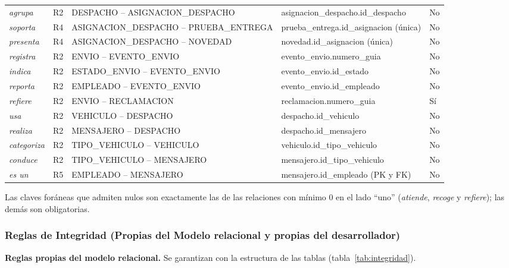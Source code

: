 {\begin{longtable}{L{2.0cm} L{1.0cm} L{4.9cm} L{4.6cm} L{1.0cm}}
\textit{agrupa} & R2 & DESPACHO -- ASIGNACION\_DESPACHO & asignacion\_despacho.id\_despacho & No \\
\textit{soporta} & R4 & ASIGNACION\_DESPACHO -- PRUEBA\_ENTREGA & prueba\_entrega.id\_asignacion (única) & No \\
\textit{presenta} & R4 & ASIGNACION\_DESPACHO -- NOVEDAD & novedad.id\_asignacion (única) & No \\
\textit{registra} & R2 & ENVIO -- EVENTO\_ENVIO & evento\_envio.numero\_guia & No \\
\textit{indica} & R2 & ESTADO\_ENVIO -- EVENTO\_ENVIO & evento\_envio.id\_estado & No \\
\textit{reporta} & R2 & EMPLEADO -- EVENTO\_ENVIO & evento\_envio.id\_empleado & No \\
\textit{refiere} & R2 & ENVIO -- RECLAMACION & reclamacion.numero\_guia & Sí \\
\textit{usa} & R2 & VEHICULO -- DESPACHO & despacho.id\_vehiculo & No \\
\textit{realiza} & R2 & MENSAJERO -- DESPACHO & despacho.id\_mensajero & No \\
\textit{categoriza} & R2 & TIPO\_VEHICULO -- VEHICULO & vehiculo.id\_tipo\_vehiculo & No \\
\textit{conduce} & R2 & TIPO\_VEHICULO -- MENSAJERO & mensajero.id\_tipo\_vehiculo & No \\
\textit{es un} & R5 & EMPLEADO -- MENSAJERO & mensajero.id\_empleado (PK y FK) & No \\
\end{longtable}
\par}

Las claves foráneas que admiten nulos son exactamente las de las
relaciones con mínimo 0 en el lado ``uno'' (\textit{atiende},
\textit{recoge} y \textit{refiere}); las demás son obligatorias.

\subsubsection{Reglas de Integridad (Propias del Modelo relacional y propias del desarrollador)}

\textbf{Reglas propias del modelo relacional.} Se garantizan con la
estructura de las tablas (tabla~\ref{tab:integridad}).


